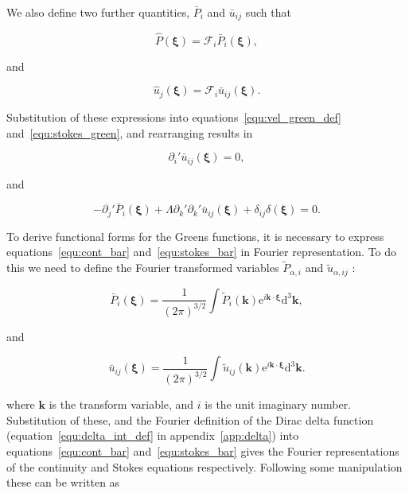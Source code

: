 \documentclass[12pt]{article}
\begin{document}
We also define two further quantities, $\bar{P}_{i}$ and $\bar{u}_{ij}$ such that

\begin{equation}
\label{equ:pres_bar}
\hat{P} (\boldsymbol{\xi}) = \mathcal{F}_{i} \bar{P}_{i} (\boldsymbol{\xi}) ,
\end{equation}

and 

\begin{equation}
\label{equ:vel_bar}
\hat{u}_{j}(\boldsymbol{\xi}) = \mathcal{F}_{i} \bar{u}_{ij} (\boldsymbol{\xi}) .
\end{equation}

Substitution of these expressions into equations~\ref{equ:vel_green_def} and~\ref{equ:stokes_green}, and rearranging results in

\begin{equation}
\label{equ:cont_bar}
\partial_{i}' \bar{u}_{ij} (\boldsymbol\xi)  = 0 ,
\end{equation}

and

\begin{equation}
\label{equ:stokes_bar}
-\partial_{j}' \bar{P}_{i} (\boldsymbol\xi) + \Lambda \partial_{k}' \partial_{k}' \bar{u}_{ij} (\boldsymbol\xi) + \delta_{ij} \delta(\boldsymbol\xi) = 0 .
\end{equation}

To derive functional forms for the Greens functions, it is necessary to express equations~\ref{equ:cont_bar} and~\ref{equ:stokes_bar} in Fourier representation. To do this we need to define the Fourier transformed variables $\tilde{P}_{\alpha, i}$ and $\tilde{u}_{\alpha,ij}$ \citep{Riley06}:

\begin{equation}
\label{equ:fourier_p}
\bar{P}_{i} (\boldsymbol\xi) = \frac{1}{(2 \pi)^{3/2}} \int \tilde{P}_{i} (\boldsymbol{k}) \mathrm{e}^{i \boldsymbol{k} \cdot \boldsymbol\xi} \mathrm{d}^{3} \boldsymbol{k} ,
\end{equation}

and 

\begin{equation}
\label{equ:fourier_vel}
\bar{u}_{ij} (\boldsymbol\xi) = \frac{1}{(2 \pi)^{3/2}} \int \tilde{u}_{ij} (\boldsymbol{k}) \mathrm{e}^{i \boldsymbol{k} \cdot \boldsymbol\xi} \mathrm{d}^{3} \boldsymbol{k} .
\end{equation}


where $\boldsymbol{k}$ is the transform variable, and $i$ is the unit imaginary number. Substitution of these, and the Fourier definition of the Dirac delta function (equation~\ref{equ:delta_int_def} in appendix~\ref{app:delta}) into equations~\ref{equ:cont_bar} and~\ref{equ:stokes_bar} gives the Fourier representations of the continuity and Stokes equations respectively. Following some manipulation these can be written as
\end{document}
